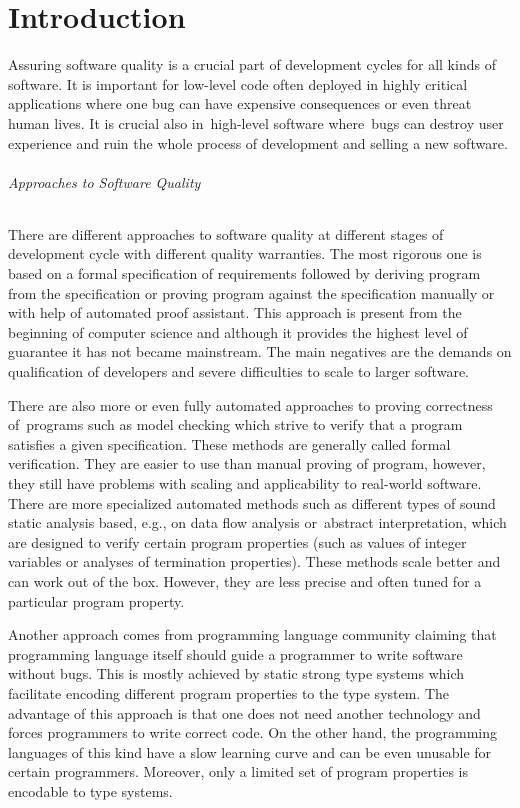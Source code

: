 \chapter{Introduction}
\label{intro}

Assuring software quality is a crucial part of development cycles
for all kinds of software.
It is important for low-level code often deployed in highly critical
applications where one bug can have expensive consequences or even threat
human lives.
It is crucial also in~high-level software where~bugs can destroy
user experience and ruin the whole process of development and selling a new software.

\subparagraph{Approaches to Software Quality}
There are different approaches to software quality at different stages of development cycle
with different quality warranties.
The most rigorous one is based on a formal specification of requirements
followed by deriving program from the specification or proving program
against the specification manually or with help of automated proof assistant.
This approach is present from the beginning of computer science and although it provides
the highest level of guarantee it has not became mainstream.
The main negatives are the demands on qualification of developers and severe difficulties to scale
to larger software.

There are also more or even fully automated approaches to proving correctness of~programs such as
model checking which strive to verify that a program satisfies a given specification.
These methods are generally called formal verification.
They are easier to use than manual proving of program, however, they still have problems with scaling and applicability to real-world software.
There are more specialized automated methods such as different types of sound static analysis based, e.g., on data flow analysis
or~abstract interpretation, which are designed to verify certain program properties
(such as values of integer variables or analyses of termination properties).
These methods scale better and can work out of the box.
However, they are less precise and often tuned for a particular program property. 

Another approach comes from programming language community claiming
that programming language itself should guide a programmer to write
software without bugs.
This is mostly achieved by static strong type systems which facilitate
encoding different program properties to the type system.
The advantage of this approach is that one does not need another technology and forces
programmers to write correct code.
On the other hand, the programming languages of this kind have a slow learning curve
and can be even unusable for certain programmers.
Moreover, only a limited set of program properties is encodable to type systems.

